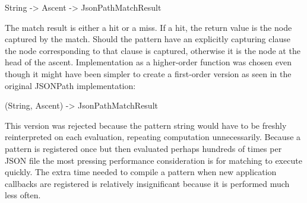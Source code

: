 \documentclass[]{article}
\newenvironment{Shaded}{}{}
\newcommand{\DataTypeTok}[1]{\textcolor[rgb]{0.56,0.13,0.00}{{#1}}}
\newcommand{\OtherTok}[1]{\textcolor[rgb]{0.00,0.44,0.13}{{#1}}}
\newcommand{\NormalTok}[1]{{#1}}
\begin{document}
\begin{Shaded}
\begin{Highlighting}[]
\DataTypeTok{String} \OtherTok{->} \DataTypeTok{Ascent} \OtherTok{->} \DataTypeTok{JsonPathMatchResult}
\end{Highlighting}
\end{Shaded}

The match result is either a hit or a miss. If a hit, the return value
is the node captured by the match. Should the pattern have an explicitly
capturing clause the node corresponding to that clause is captured,
otherwise it is the node at the head of the ascent. Implementation as a
higher-order function was chosen even though it might have been simpler
to create a first-order version as seen in the original JSONPath
implementation:

\begin{Shaded}
\begin{Highlighting}[]
\NormalTok{(}\DataTypeTok{String}\NormalTok{, }\DataTypeTok{Ascent}\NormalTok{) }\OtherTok{->} \DataTypeTok{JsonPathMatchResult}
\end{Highlighting}
\end{Shaded}

This version was rejected because the pattern string would have to be
freshly reinterpreted on each evaluation, repeating computation
unnecessarily. Because a pattern is registered once but then evaluated
perhaps hundreds of times per JSON file the most pressing performance
consideration is for matching to execute quickly. The extra time needed
to compile a pattern when new application callbacks are registered is
relatively insignificant because it is performed much less often.
\end{document}
